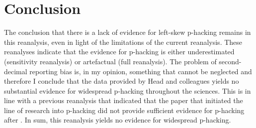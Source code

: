 \section*{Conclusion}
The conclusion that there is a lack of evidence for left-skew p-hacking remains in this reanalysis, even in light of the limitations of the current reanalysis. 
These reanalyses indicate that the evidence for p-hacking is either underestimated (sensitivity reanalysis) or artefactual  (full reanalysis). The problem of second-decimal reporting bias is, in my opinion, something that cannot be neglected and therefore I conclude that the data provided by Head and colleagues yields no substantial evidence for widespread p-hacking throughout the sciences. This is in line with a previous reanalysis that indicated that the paper that initiated the line of research into p-hacking \cite{Masicampo2012} did not provide sufficient evidence for p-hacking after \cite{Lakens2014}. In sum, this reanalysis yields no evidence for widespread p-hacking.
  
  
  
